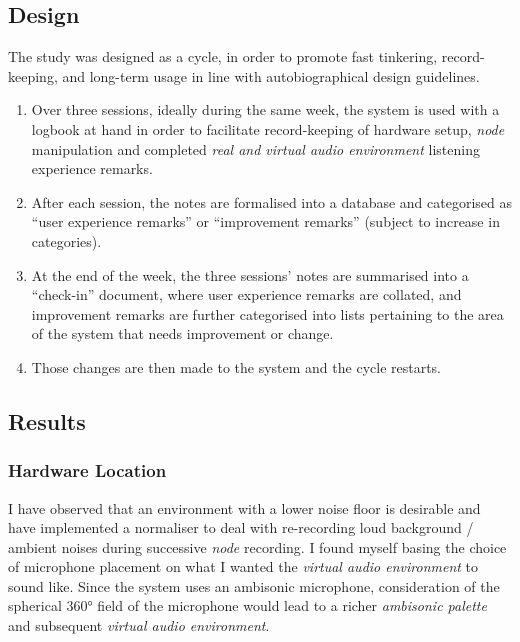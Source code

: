 \subsection{Design}
                                                \label{sec: area-study-design}
The study was designed as a cycle, in order to promote fast tinkering, record-keeping, and long-term usage in line with autobiographical design guidelines. 
\begin{enumerate}
    \item Over three sessions, ideally during the same week, the system is used with a logbook at hand in order to facilitate record-keeping of hardware setup, \textit{node} manipulation and completed \textit{real and virtual audio environment} listening experience remarks.
    \item After each session, the notes are formalised into a database and categorised as “user experience remarks” or “improvement remarks” (subject to increase in categories). 
    \item At the end of the week, the three sessions’ notes are summarised into a “check-in” document, where user experience remarks are collated, and improvement remarks are further categorised into lists pertaining to the area of the system that needs improvement or change.
    \item Those changes are then made to the system and the cycle restarts.
\end{enumerate}

\subsection{Results}                            \label{sec: area-study-results}
\subsubsection{Hardware Location}               \label{sec: area-study-results-hwloc}
I have observed that an environment with a lower noise floor is desirable and have implemented a normaliser to deal with re-recording loud background / ambient noises during successive \textit{node} recording. I found myself basing the choice of microphone placement on what I wanted the \textit{virtual audio environment} to sound like. Since the system uses an ambisonic microphone, consideration of the spherical 360° field of the microphone would lead to a richer \textit{ambisonic palette} and subsequent \textit{virtual audio environment}.


